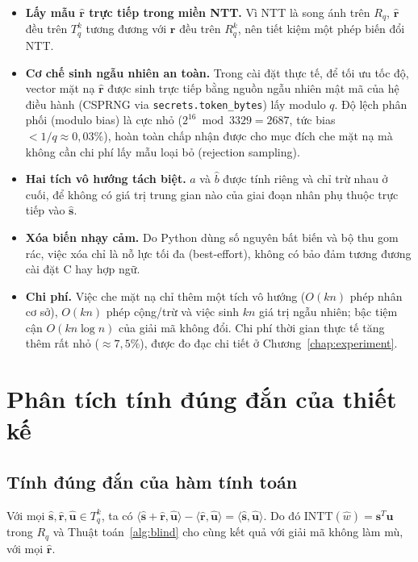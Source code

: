 \documentclass[../LuanVan.tex]{subfiles}
\begin{document}
\begin{itemize}
\item \textbf{Lấy mẫu $\hat{\mathbf{r}}$ trực tiếp trong miền NTT.} Vì NTT là song ánh trên $R_q$, $\hat{\mathbf{r}}$ đều trên $T_q^k$ tương đương với $\mathbf{r}$ đều trên $R_q^k$, nên tiết kiệm một phép biến đổi NTT.
\item \textbf{Cơ chế sinh ngẫu nhiên an toàn.} Trong cài đặt thực tế, để tối ưu tốc độ, vector mặt nạ $\hat{\mathbf{r}}$ được sinh trực tiếp bằng nguồn ngẫu nhiên mật mã của hệ điều hành (CSPRNG via \texttt{secrets.token\_bytes}) lấy modulo $q$. Độ lệch phân phối (modulo bias) là cực nhỏ ($2^{16} \bmod 3329 = 2687$, tức bias $< 1/q \approx 0{,}03\%$), hoàn toàn chấp nhận được cho mục đích che mặt nạ mà không cần chi phí lấy mẫu loại bỏ (rejection sampling).
\item \textbf{Hai tích vô hướng tách biệt.} $\hat{a}$ và $\hat{b}$ được tính riêng và chỉ trừ nhau ở cuối, để không có giá trị trung gian nào của giai đoạn nhân phụ thuộc trực tiếp vào $\hat{\mathbf{s}}$.
\item \textbf{Xóa biến nhạy cảm.} Do Python dùng số nguyên bất biến và bộ thu gom rác, việc xóa chỉ là nỗ lực tối đa (best-effort), không có bảo đảm tương đương cài đặt C hay hợp ngữ.
\item \textbf{Chi phí.} Việc che mặt nạ chỉ thêm một tích vô hướng ($O(kn)$ phép nhân cơ sở), $O(kn)$ phép cộng/trừ và việc sinh $kn$ giá trị ngẫu nhiên; bậc tiệm cận $O(kn\log n)$ của giải mã không đổi. Chi phí thời gian thực tế tăng thêm rất nhỏ ($\approx 7{,}5\%$), được đo đạc chi tiết ở Chương~\ref{chap:experiment}.
\end{itemize}
 
\section{Phân tích tính đúng đắn của thiết kế}
\label{sec:correctness}
 
\subsection{Tính đúng đắn của hàm tính toán}
 
\begin{menhde}\label{prop:func}
Với mọi $\hat{\mathbf{s}},\hat{\mathbf{r}},\hat{\mathbf{u}}\in T_q^k$, ta có $\langle\hat{\mathbf{s}}+\hat{\mathbf{r}},\hat{\mathbf{u}}\rangle-\langle\hat{\mathbf{r}},\hat{\mathbf{u}}\rangle=\langle\hat{\mathbf{s}},\hat{\mathbf{u}}\rangle$. Do đó $\mathrm{INTT}(\hat{w})=\mathbf{s}^T\mathbf{u}$ trong $R_q$ và Thuật toán~\ref{alg:blind} cho cùng kết quả với giải mã không làm mù, với mọi $\hat{\mathbf{r}}$.
\end{menhde}
 
\end{document}
